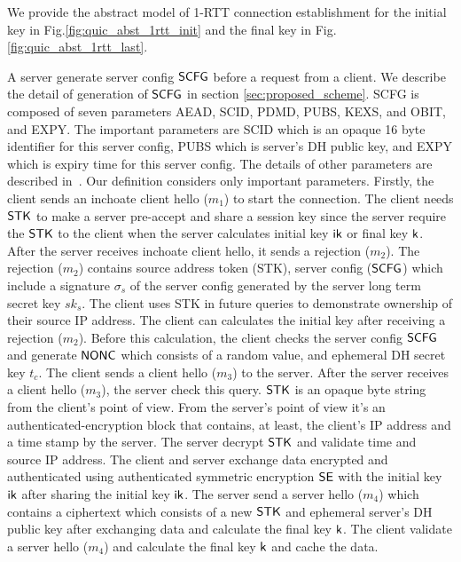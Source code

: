 We provide the abstract model of 1-RTT connection establishment
for the initial key in Fig.\ref{fig:quic_abst_1rtt_init} and
the final key in Fig.\ref{fig:quic_abst_1rtt_last}.
%

\ONERTTtrue
\ORIGINALtrue

%
A server generate server config $\mathsf{SCFG}$ before a request from a client.
We describe the detail of generation of $\mathsf{SCFG}$ in section \ref{sec:proposed_scheme}.
SCFG is composed of seven parameters AEAD, SCID, PDMD,
PUBS, KEXS, and OBIT, and EXPY. The important parameters
are SCID which is an opaque 16 byte identifier for
this server config, PUBS which is server's
DH public key, and EXPY which is expiry time
for this server config. The details of other parameters
are described in~\cite{QUIC:Crypto}.
Our definition considers only important parameters.
Firstly, the client sends an inchoate client
hello ($m_1$) to start the connection.
The client needs $\mathsf{STK}$ to make a server pre-accept and share
a session key since the server require the $\mathsf{STK}$ to the client
when the server calculates initial key $\mathsf{ik}$ or final key $\mathsf{k}$.
After the server receives inchoate client hello, it
sends a rejection ($m_2$). The rejection ($m_2$) contains
source address token (STK), server config ($\mathsf{SCFG}$) which
include a signature $\sigma_s$ of the server config generated
by the server long term secret key $sk_s$. The client uses
STK in future queries to demonstrate ownership of their
source IP address.
The client can calculates the initial key after receiving
a rejection ($m_2$). Before this calculation, the client
checks the server config $\mathsf{SCFG}$ and generate $\mathsf{NONC}$ which consists
of a random value, and ephemeral
DH secret key $t_c$.
The client sends a client hello ($m_3$) to the server.
After the server receives a client hello ($m_3$), the
server check this query. $\mathsf{STK}$ is an opaque byte string
from the client's point of view. From the server's point
of view it's an authenticated-encryption block that
contains, at least, the client's IP address and a time
stamp by the server. The server decrypt $\mathsf{STK}$ and
validate time and source IP address.
The client and server
exchange data encrypted and authenticated using authenticated
symmetric encryption $\mathsf{SE}$ with the initial key $\mathsf{ik}$ after
sharing the initial key $\mathsf{ik}$.
The server send a server hello ($m_4$) which contains
a ciphertext which consists of a new $\mathsf{STK}$ and ephemeral server's
DH public key after exchanging data and
calculate the final key $\mathsf{k}$.
The client validate a server hello ($m_4$) and calculate
the final key $\mathsf{k}$ and cache the data.

